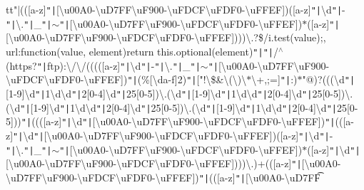 tt{"|}(([a-\/z]\texttt{"|}[\textbackslash{}u00\+A0-\/\textbackslash{}u\+D7\+F\+F\textbackslash{}u\+F900-\/\textbackslash{}u\+F\+D\+C\+F\textbackslash{}u\+F\+D\+F0-\/\textbackslash{}u\+F\+F\+EF])([a-\/z]\texttt{"|}\textbackslash{}d\texttt{"|}-\/\texttt{"|}\textbackslash{}.\texttt{"|}\+\_\+\texttt{"|}$\sim$\texttt{"|}[\textbackslash{}u00\+A0-\/\textbackslash{}u\+D7\+F\+F\textbackslash{}u\+F900-\/\textbackslash{}u\+F\+D\+C\+F\textbackslash{}u\+F\+D\+F0-\/\textbackslash{}u\+F\+F\+EF])$\ast$([a-\/z]\texttt{"|}[\textbackslash{}u00\+A0-\/\textbackslash{}u\+D7\+F\+F\textbackslash{}u\+F900-\/\textbackslash{}u\+F\+D\+C\+F\textbackslash{}u\+F\+D\+F0-\/\textbackslash{}u\+F\+F\+EF])))\textbackslash{}.?\$/i.\+test(value);\rcurly{}, url\+:function(value, element)\lcurly{}return this.\+optional(element)\texttt{"|}\texttt{"|}/$^\wedge$(https?\texttt{"|}ftp)\+:\textbackslash{}/\textbackslash{}/(((([a-\/z]\texttt{"|}\textbackslash{}d\texttt{"|}-\/\texttt{"|}\textbackslash{}.\texttt{"|}\+\_\+\texttt{"|}$\sim$\texttt{"|}[\textbackslash{}u00\+A0-\/\textbackslash{}u\+D7\+F\+F\textbackslash{}u\+F900-\/\textbackslash{}u\+F\+D\+C\+F\textbackslash{}u\+F\+D\+F0-\/\textbackslash{}u\+F\+F\+EF])\texttt{"|}(\%[\textbackslash{}da-\/f]\lcurly{}2\rcurly{})\texttt{"|}["!\textbackslash{}\$\&\textquotesingle{}\textbackslash{}(\textbackslash{})\textbackslash{}$\ast$\textbackslash{}+,;=]\texttt{"|}\+:)$\ast$"@)?(((\textbackslash{}d\texttt{"|}[1-\/9]\textbackslash{}d\texttt{"|}1\textbackslash{}d\textbackslash{}d\texttt{"|}2[0-\/4]\textbackslash{}d\texttt{"|}25[0-\/5])\textbackslash{}.(\textbackslash{}d\texttt{"|}[1-\/9]\textbackslash{}d\texttt{"|}1\textbackslash{}d\textbackslash{}d\texttt{"|}2[0-\/4]\textbackslash{}d\texttt{"|}25[0-\/5])\textbackslash{}.(\textbackslash{}d\texttt{"|}[1-\/9]\textbackslash{}d\texttt{"|}1\textbackslash{}d\textbackslash{}d\texttt{"|}2[0-\/4]\textbackslash{}d\texttt{"|}25[0-\/5])\textbackslash{}.(\textbackslash{}d\texttt{"|}[1-\/9]\textbackslash{}d\texttt{"|}1\textbackslash{}d\textbackslash{}d\texttt{"|}2[0-\/4]\textbackslash{}d\texttt{"|}25[0-\/5]))\texttt{"|}((([a-\/z]\texttt{"|}\textbackslash{}d\texttt{"|}[\textbackslash{}u00\+A0-\/\textbackslash{}u\+D7\+F\+F\textbackslash{}u\+F900-\/\textbackslash{}u\+F\+D\+C\+F\textbackslash{}u\+F\+D\+F0-\/\textbackslash{}u\+F\+F\+EF])\texttt{"|}(([a-\/z]\texttt{"|}\textbackslash{}d\texttt{"|}[\textbackslash{}u00\+A0-\/\textbackslash{}u\+D7\+F\+F\textbackslash{}u\+F900-\/\textbackslash{}u\+F\+D\+C\+F\textbackslash{}u\+F\+D\+F0-\/\textbackslash{}u\+F\+F\+EF])([a-\/z]\texttt{"|}\textbackslash{}d\texttt{"|}-\/\texttt{"|}\textbackslash{}.\texttt{"|}\+\_\+\texttt{"|}$\sim$\texttt{"|}[\textbackslash{}u00\+A0-\/\textbackslash{}u\+D7\+F\+F\textbackslash{}u\+F900-\/\textbackslash{}u\+F\+D\+C\+F\textbackslash{}u\+F\+D\+F0-\/\textbackslash{}u\+F\+F\+EF])$\ast$([a-\/z]\texttt{"|}\textbackslash{}d\texttt{"|}[\textbackslash{}u00\+A0-\/\textbackslash{}u\+D7\+F\+F\textbackslash{}u\+F900-\/\textbackslash{}u\+F\+D\+C\+F\textbackslash{}u\+F\+D\+F0-\/\textbackslash{}u\+F\+F\+EF])))\textbackslash{}.)+(([a-\/z]\texttt{"|}[\textbackslash{}u00\+A0-\/\textbackslash{}u\+D7\+F\+F\textbackslash{}u\+F900-\/\textbackslash{}u\+F\+D\+C\+F\textbackslash{}u\+F\+D\+F0-\/\textbackslash{}u\+F\+F\+EF])\texttt{"|}(([a-\/z]\texttt{"|}[\textbackslash{}u00\+A0-\/\textbackslash{}u\+D7\+F\+F\t
